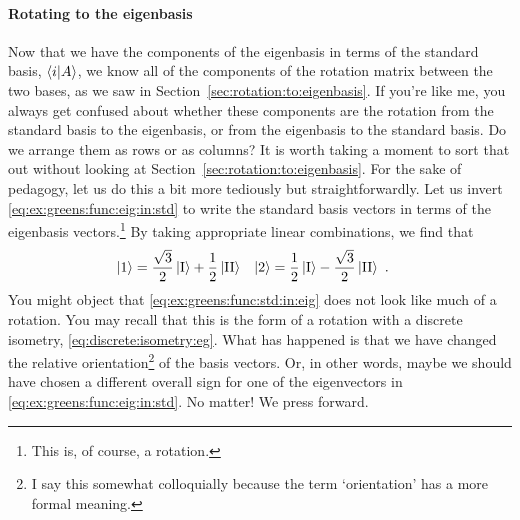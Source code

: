 \documentclass[12pt, oneside]{report}    %
\begin{document}
\paragraph{Rotating to the eigenbasis} Now that we have the components of the eigenbasis in terms of the standard basis, $\langle i | A \rangle$, we know all of the components of the rotation matrix between the two bases, as we saw in Section~\ref{sec:rotation:to:eigenbasis}. If you're like me, you always get confused about whether these components are the rotation from the standard basis to the eigenbasis, or from the eigenbasis to the standard basis. Do we arrange them as rows or as columns? It is worth taking a moment to sort that out without looking at Section~\ref{sec:rotation:to:eigenbasis}. For the sake of pedagogy, let us do this a bit more tediously but straightforwardly. Let us invert \eqref{eq:ex:greens:func:eig:in:std} to write the standard basis vectors in terms of the eigenbasis vectors.\footnote{This is, of course, a rotation.} By taking appropriate linear combinations, we find that
\begin{align}
    \left|1\right\rangle
    &=
    \frac{\sqrt{3}}{2} 
    \left|\textnormal{I}\right\rangle
    + 
    \frac{1}{2}
    \left|\textnormal{II}\right\rangle
    &
    \left|2\right\rangle
    &=
    \frac{1}{2}
    \left|\textnormal{I}\right\rangle
    - 
    \frac{\sqrt{3}}{2}
    \left|\textnormal{II}\right\rangle
    \ .
    \label{eq:ex:greens:func:std:in:eig}
\end{align}
You might object that \eqref{eq:ex:greens:func:std:in:eig} does not look like much of a rotation. You may recall that this is the form of a rotation with a discrete isometry, \eqref{eq:discrete:isometry:eg}. What has happened is that we have changed the relative orientation\footnote{I say this somewhat colloquially because the term `orientation' has a more formal meaning.} of the basis vectors. Or, in other words, maybe we should have chosen a different overall sign for one of the eigenvectors in \eqref{eq:ex:greens:func:eig:in:std}. No matter! We press forward.
\end{document}

